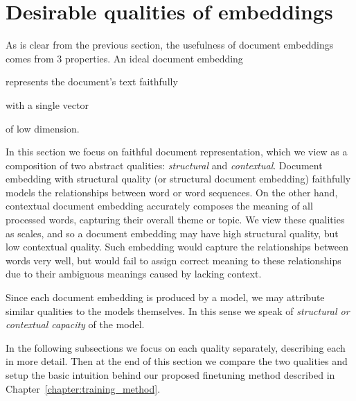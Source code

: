 \section{Desirable qualities of embeddings}





As is clear from the previous section, the usefulness of document embeddings
comes from 3 properties. An ideal document embedding
\begin{enumerate*}[label=(\arabic*)]
  \item represents the document's text faithfully
  \item with a single vector
  \item of low dimension.
\end{enumerate*}

In this section we focus on faithful document representation, which we view as a
composition of two abstract qualities: \emph{structural} and \emph{contextual}.
Document embedding with structural quality (or structural document embedding)
faithfully models the relationships between word or word sequences. On the other
hand, contextual document embedding accurately composes the meaning of all
processed words, capturing their overall theme or topic. We view these qualities
as scales, and so a document embedding may have high structural quality, but low
contextual quality. Such embedding would capture the relationships between words
very well, but would fail to assign correct meaning to these relationships due
to their ambiguous meanings caused by lacking context.

Since each document embedding is produced by a model, we may attribute similar
qualities to the models themselves. In this sense we speak of \emph{structural
or contextual capacity} of the model.

In the following subsections we focus on each quality separately, describing
each in more detail. Then at the end of this section we compare the two
qualities and setup the basic intuition behind our proposed finetuning method
described in Chapter~\ref{chapter:training_method}.

